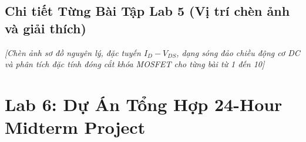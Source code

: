 \documentclass[12pt,a4paper]{report}
\begin{document}
\begin{orangebox}
\centering
\vspace{0.3cm}
\vspace{0.3cm}
\end{orangebox}

\subsection*{Chi tiết Từng Bài Tập Lab 5 (Vị trí chèn ảnh và giải thích)}
\begin{orangebox}
\textit{\color{guidegray}[Chèn ảnh sơ đồ nguyên lý, đặc tuyến $I_D-V_{DS}$, dạng sóng đảo chiều động cơ DC và phân tích đặc tính đóng cắt khóa MOSFET cho từng bài từ 1 đến 10]}
\end{orangebox}

\section{Lab 6: Dự Án Tổng Hợp 24-Hour Midterm Project}
\end{document}
